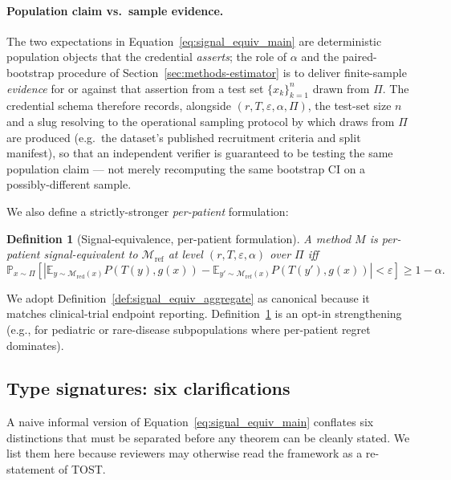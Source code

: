 \documentclass[twoside,11pt]{article}
\newtheorem{definition}{Definition}
\newcommand{\Mref}{\mathcal{M}_{\textrm{ref}}}
\newcommand{\Mred}{\mathcal{M}_{\textrm{red}}}
\newcommand{\Prob}{\mathbb{P}}
\newcommand{\E}{\mathbb{E}}
\begin{document}
\paragraph{Population claim vs.\ sample evidence.} The two expectations in Equation~\eqref{eq:signal_equiv_main} are deterministic population objects that the credential \emph{asserts}; the role of $\alpha$ and the paired-bootstrap procedure of Section~\ref{sec:methods-estimator} is to deliver finite-sample \emph{evidence} for or against that assertion from a test set $\{x_k\}_{k=1}^n$ drawn from $\Pi$. The credential schema therefore records, alongside $(r, T, \varepsilon, \alpha, \Pi)$, the test-set size $n$ and a slug resolving to the operational sampling protocol by which draws from $\Pi$ are produced (e.g.\ the dataset's published recruitment criteria and split manifest), so that an independent verifier is guaranteed to be testing the same population claim --- not merely recomputing the same bootstrap CI on a possibly-different sample.

We also define a strictly-stronger \emph{per-patient} formulation:

\begin{definition}[Signal-equivalence, per-patient formulation]
\label{def:signal_equiv_per_patient}
A method $M$ is \emph{per-patient signal-equivalent} to $\Mref$ at level $(r, T, \varepsilon, \alpha)$ over $\Pi$ iff
\begin{equation}
    \Prob_{x \sim \Pi}\!\left[ \left| \E_{y \sim \Mred(x)} P(T(y), g(x)) - \E_{y' \sim \Mref(x)} P(T(y'), g(x)) \right| < \varepsilon \right] \geq 1 - \alpha.
\end{equation}
\end{definition}

We adopt Definition~\ref{def:signal_equiv_aggregate} as canonical because it matches clinical-trial endpoint reporting. Definition~\ref{def:signal_equiv_per_patient} is an opt-in strengthening (e.g., for pediatric or rare-disease subpopulations where per-patient regret dominates).

\subsection{Type signatures: six clarifications}
\label{sec:framework_clarifications}

A naive informal version of Equation~\eqref{eq:signal_equiv_main} conflates six distinctions that must be separated before any theorem can be cleanly stated. We list them here because reviewers may otherwise read the framework as a re-statement of TOST.
\end{document}
